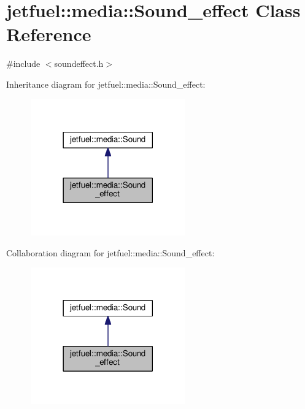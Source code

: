 \hypertarget{classjetfuel_1_1media_1_1Sound__effect}{}\section{jetfuel\+:\+:media\+:\+:Sound\+\_\+effect Class Reference}
\label{classjetfuel_1_1media_1_1Sound__effect}


{\ttfamily \#include $<$soundeffect.\+h$>$}



Inheritance diagram for jetfuel\+:\+:media\+:\+:Sound\+\_\+effect\+:\nopagebreak
\begin{figure}[H]
\begin{center}
\leavevmode
\includegraphics[width=189pt]{classjetfuel_1_1media_1_1Sound__effect__inherit__graph}
\end{center}
\end{figure}


Collaboration diagram for jetfuel\+:\+:media\+:\+:Sound\+\_\+effect\+:\nopagebreak
\begin{figure}[H]
\begin{center}
\leavevmode
\includegraphics[width=189pt]{classjetfuel_1_1media_1_1Sound__effect__coll__graph}
\end{center}
\end{figure}
